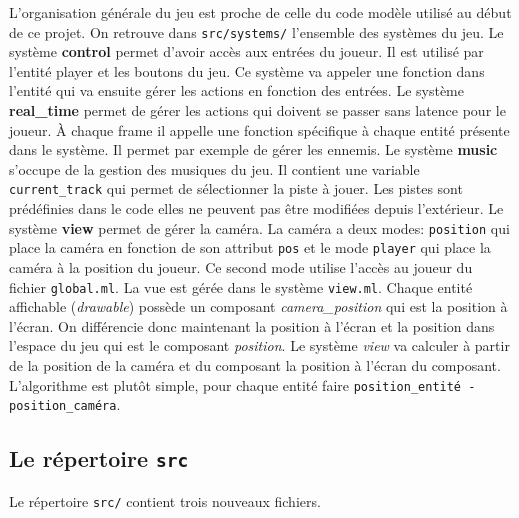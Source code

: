 \documentclass{article}
\begin{document}
L'organisation générale du jeu est proche de celle du code modèle utilisé au début de ce projet.
On retrouve dans \verb|src/systems/| l'ensemble des systèmes du jeu. Le système \textbf{control} permet 
d'avoir accès aux entrées du joueur. Il est utilisé par l'entité player et les boutons du jeu. Ce 
système va appeler une fonction dans l'entité qui va ensuite gérer les actions en fonction des entrées.
Le système \textbf{real\_time} permet de gérer les actions qui doivent se passer sans latence pour le joueur.
À chaque frame il appelle une fonction spécifique à chaque entité présente dans le système. Il permet par exemple
de gérer les ennemis. Le système \textbf{music} s'occupe de la gestion des musiques du jeu. Il contient une 
variable \verb|current_track| qui permet de sélectionner la piste à jouer. Les pistes sont prédéfinies dans le code 
elles ne peuvent pas être modifiées depuis l'extérieur. Le système \textbf{view} permet de gérer la caméra.
La caméra a deux modes: \verb|position| qui place la caméra en fonction de son attribut 
\verb|pos| et le mode \verb|player| qui place la caméra à la position du joueur. Ce second mode utilise 
l'accès au joueur du fichier \verb|global.ml|. La vue est gérée dans le système \verb|view.ml|. Chaque 
entité affichable (\textit{drawable}) possède un composant \textit{camera\_position} qui est la position 
à l'écran. On différencie donc maintenant la position à l'écran et la position dans l'espace du jeu qui 
est le composant \textit{position}. Le système \textit{view} va calculer à partir de la position de la 
caméra et du composant la position à l'écran du composant. L'algorithme est plutôt simple, pour chaque 
entité faire \verb|position_entité - position_caméra|. 

\subsection{Le répertoire \texttt{src}}
Le répertoire \verb|src/| contient trois nouveaux fichiers. 
\end{document}
